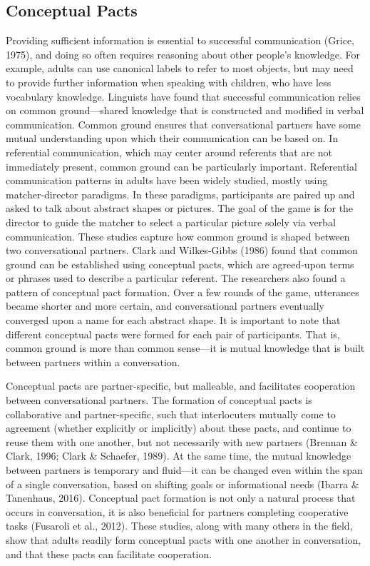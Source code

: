 \documentclass[10pt, letterpaper]{article}
\begin{document}
\hypertarget{conceptual-pacts}{%
\subsection{Conceptual Pacts}\label{conceptual-pacts}}

Providing sufficient information is essential to successful
communication (Grice, 1975), and doing so often requires reasoning about
other people's knowledge. For example, adults can use canonical labels
to refer to most objects, but may need to provide further information
when speaking with children, who have less vocabulary knowledge.
Linguists have found that successful communication relies on common
ground---shared knowledge that is constructed and modified in verbal
communication. Common ground ensures that conversational partners have
some mutual understanding upon which their communication can be based
on. In referential communication, which may center around referents that
are not immediately present, common ground can be particularly
important. Referential communication patterns in adults have been widely
studied, mostly using matcher-director paradigms. In these paradigms,
participants are paired up and asked to talk about abstract shapes or
pictures. The goal of the game is for the director to guide the matcher
to select a particular picture solely via verbal communication. These
studies capture how common ground is shaped between two conversational
partners. Clark and Wilkes-Gibbs (1986) found that common ground can be
established using conceptual pacts, which are agreed-upon terms or
phrases used to describe a particular referent. The researchers also
found a pattern of conceptual pact formation. Over a few rounds of the
game, utterances became shorter and more certain, and conversational
partners eventually converged upon a name for each abstract shape. It is
important to note that different conceptual pacts were formed for each
pair of participants. That is, common ground is more than common
sense---it is mutual knowledge that is built between partners within a
conversation.

Conceptual pacts are partner-specific, but malleable, and facilitates
cooperation between conversational partners. The formation of conceptual
pacts is collaborative and partner-specific, such that interlocuters
mutually come to agreement (whether explicitly or implicitly) about
these pacts, and continue to reuse them with one another, but not
necessarily with new partners (Brennan \& Clark, 1996; Clark \&
Schaefer, 1989). At the same time, the mutual knowledge between partners
is temporary and fluid---it can be changed even within the span of a
single conversation, based on shifting goals or informational needs
(Ibarra \& Tanenhaus, 2016). Conceptual pact formation is not only a
natural process that occurs in conversation, it is also beneficial for
partners completing cooperative tasks (Fusaroli et al., 2012). These
studies, along with many others in the field, show that adults readily
form conceptual pacts with one another in conversation, and that these
pacts can facilitate cooperation.
\end{document}

